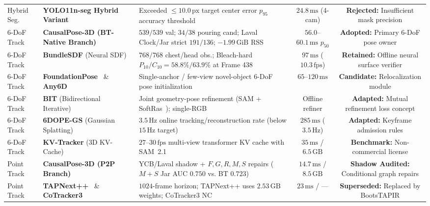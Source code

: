 \documentclass[10pt,journal]{IEEEtran}
\begin{document}
\begin{table}[t]
{\begin{tabular}{@{}llp{6.6cm}cc@{}}
        Hybrid Seg. & \textbf{YOLO11n-seg Hybrid Variant}~\cite{jocher2024yolo11} & Exceeded $\le 10.0\,\mathrm{px}$ target center error $p_{95}$ accuracy threshold & $24.8\,\mathrm{ms}$ (4-cam) & \textbf{Rejected:} Insufficient mask precision \\
        6-DoF Track & \textbf{CausalPose-3D (BT-Native Branch)}~\cite{wen2021bundletrack} & $539/539$ val; $34/38$ pouring cand; Laval Clock/Jar strict $191/136$; $-1.99\,\mathrm{GiB}$ RSS & $56.0$--$60.1\,\mathrm{ms}$ $p_{50}$ & \textbf{Adopted:} Primary 6-DoF pose owner \\
        6-DoF Track & \textbf{BundleSDF} (Neural SDF)~\cite{wen2023bundlesdf} & $768/768$ chest/head obs.; Bleach-hard $P_{10}/C_{10}=58.8\%/63.9\%$ at Frame 438 & $97\,\mathrm{ms}$ ($10.3\,\mathrm{fps}$) & \textbf{Retained:} Offline neural surface verifier \\
        6-DoF Track & \textbf{FoundationPose}~\cite{wen2024foundationpose} \& \textbf{Any6D}~\cite{lee2025any6d} & Single-anchor / few-view novel-object 6-DoF pose initialization & $65$--$120\,\mathrm{ms}$ & \textbf{Candidate:} Relocalization module \\
        6-DoF Track & \textbf{BIT} (Bidirectional Iterative)~\cite{song2025bit} & Joint geometry-pose refinement (SAM + SoftRas~\cite{liu2019softras}); single-RGB & Offline refiner & \textbf{Adapted:} Mutual refinement loss concept \\
        6-DoF Track & \textbf{6DOPE-GS} (Gaussian Splatting)~\cite{jin20256dopegs} & $3.5\,\mathrm{Hz}$ online tracking/reconstruction rate (below $15\,\mathrm{Hz}$ target) & $285\,\mathrm{ms}$ ($3.5\,\mathrm{Hz}$) & \textbf{Adapted:} Keyframe admission rules \\
        6-DoF Track & \textbf{KV-Tracker} (3D KV-Cache)~\cite{elich2026kvtracker} & $27$--$30\,\mathrm{fps}$ multi-view transformer KV cache with SAM~2.1 & $35\,\mathrm{ms}$ / $6.5\,\mathrm{GB}$ & \textbf{Benchmark:} Non-commercial license \\
        Point Track & \textbf{CausalPose-3D (P2P Branch)}~\cite{point2pose2026,doersch2024bootstap} & YCB/Laval shadow + $F,G,R,M,S$ repairs ($M+S$ Jar AUC $0.750$ vs. BT $0.723$) & $14.7\,\mathrm{ms}$ / $8.5\,\mathrm{GB}$ & \textbf{Shadow Audited:} Conditional graph repairs \\
        Point Track & \textbf{TAPNext++}~\cite{zholus2025tapnext} \& \textbf{CoTracker3}~\cite{karaev2024cotracker3} & $1024$-frame horizon; TAPNext++ uses $2.53\,\mathrm{GB}$ weights; CoTracker3 NC & $23\,\mathrm{ms}$ / --- & \textbf{Superseded:} Replaced by BootsTAPIR \\

\end{tabular}}
\end{table}
\end{document}
